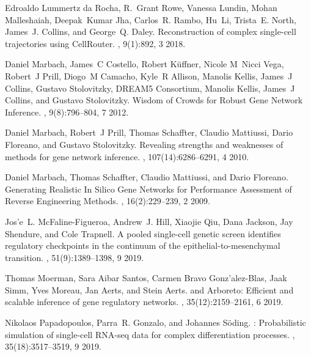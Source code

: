 \documentclass[10pt, a4paper]{article}
\begin{document}
\begin{thebibliography}{10}
	Edroaldo {Lummertz da Rocha}, R.~Grant Rowe, Vanessa Lundin, Mohan Malleshaiah,
	Deepak~Kumar Jha, Carlos~R. Rambo, Hu~Li, Trista~E. North, James~J. Collins,
	and George~Q. Daley.
	\newblock Reconstruction of complex single-cell trajectories using
	{{CellRouter}}.
	, 9(1):892, 3 2018.
	
	Daniel Marbach, James~C Costello, Robert K{\"u}ffner, Nicole M~Nicci Vega,
	Robert~J Prill, Diogo~M Camacho, Kyle~R Allison, Manolis Kellis, James~J
	Collins, Gustavo Stolovitzky, {DREAM5 Consortium}, Manolis Kellis, James~J
	Collins, and Gustavo Stolovitzky.
	\newblock Wisdom of {{Crowds}} for {{Robust Gene Network Inference}}.
	, 9(8):796--804, 7 2012.
	
	Daniel Marbach, Robert~J Prill, Thomas Schaffter, Claudio Mattiussi, Dario
	Floreano, and Gustavo Stolovitzky.
	\newblock Revealing strengths and weaknesses of methods for gene network
	inference.
	,
	107(14):6286--6291, 4 2010.
	
	Daniel Marbach, Thomas Schaffter, Claudio Mattiussi, and Dario Floreano.
	\newblock Generating {{Realistic In Silico Gene Networks}} for {{Performance
			Assessment}} of {{Reverse Engineering Methods}}.
	, 16(2):229--239, 2 2009.
	
	Jos{\a'e}~L. McFaline-Figueroa, Andrew~J. Hill, Xiaojie Qiu, Dana Jackson, Jay
	Shendure, and Cole Trapnell.
	\newblock A pooled single-cell genetic screen identifies regulatory checkpoints
	in the continuum of the epithelial-to-mesenchymal transition.
	, 51(9):1389--1398, 9 2019.
	
	Thomas Moerman, Sara {Aibar Santos}, Carmen {Bravo Gonz{\a'a}lez-Blas}, Jaak
	Simm, Yves Moreau, Jan Aerts, and Stein Aerts.
	 and {{Arboreto}}: Efficient and scalable inference of
	gene regulatory networks.
	, 35(12):2159--2161, 6 2019.
	
	Nikolaos Papadopoulos, Parra~R. Gonzalo, and Johannes S{\"o}ding.
	: Probabilistic simulation of single-cell {{RNA}}-seq data
	for complex differentiation processes.
	, 35(18):3517--3519, 9 2019.
	

\end{thebibliography}
\end{document}
